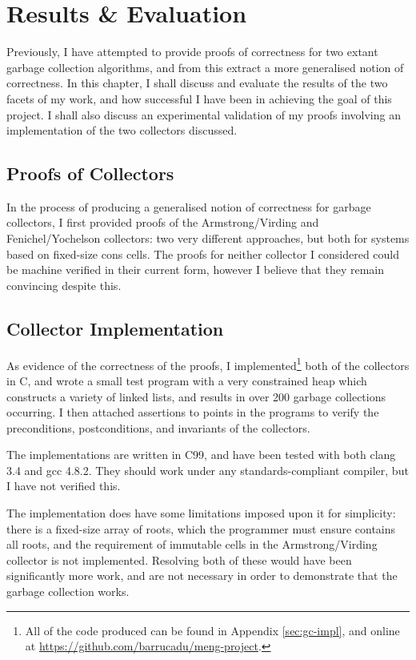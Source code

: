 \chapter{Results \& Evaluation}
\label{sec:results}

Previously, I have attempted to provide proofs of correctness for two
extant garbage collection algorithms, and from this extract a more
generalised notion of correctness. In this chapter, I shall discuss
and evaluate the results of the two facets of my work, and how
successful I have been in achieving the goal of this project. I shall
also discuss an experimental validation of my proofs involving an
implementation of the two collectors discussed.

\section{Proofs of Collectors}
\label{sec:results-collectors}

In the process of producing a generalised notion of correctness for
garbage collectors, I first provided proofs of the Armstrong/Virding
and Fenichel/Yochelson collectors: two very different approaches, but
both for systems based on fixed-size cons cells. The proofs for
neither collector I considered could be machine verified in their
current form, however I believe that they remain convincing despite
this.

\section{Collector Implementation}
\label{sec:results-impl}

As evidence of the correctness of the proofs, I
implemented\footnote{All of the code produced can be found in Appendix
  \ref{sec:gc-impl}, and online at
  \url{https://github.com/barrucadu/meng-project}.} both of the
collectors in C, and wrote a small test program with a very
constrained heap which constructs a variety of linked lists, and
results in over 200 garbage collections occurring. I then attached
assertions to points in the programs to verify the preconditions,
postconditions, and invariants of the collectors.

The implementations are written in C99, and have been tested with both
clang 3.4 and gcc 4.8.2. They should work under any
standards-compliant compiler, but I have not verified this.

The implementation does have some limitations imposed upon it for
simplicity: there is a fixed-size array of roots, which the programmer
must ensure contains all roots, and the requirement of immutable cells
in the Armstrong/Virding collector is not implemented. Resolving both
of these would have been significantly more work, and are not
necessary in order to demonstrate that the garbage collection works.

